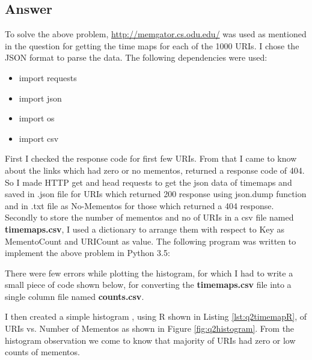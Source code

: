 \documentclass[letterpaper,11pt]{article}
\begin{document}
\subsection*{Answer}
To solve the above problem,  \url{http://memgator.cs.odu.edu/} was used as mentioned in the question for getting the time maps for each of the 1000 URIs. I chose the JSON format to parse the data. The following dependencies were used:
\begin{itemize}
  \item import requests
  \item import json
  \item import os
  \item import csv
  
\end{itemize}  
First I checked the response code for first few URIs. From that I came to know about the links which had zero or no mementos, returned a response code of 404. So I made HTTP get and head requests to get the json data of timemaps and saved in .json file for URIs which returned 200 response using json.dump \cite{jsonref} function and in .txt file as No-Mementos for those which returned a 404 response.
Secondly to store the number of mementos and no of URIs in a csv file \cite{csvref} named \textbf{timemaps.csv}, I used a dictionary to arrange them with respect to Key as MementoCount and URICount as value.
The following program was written to implement the above problem in Python 3.5:

There were few errors while plotting the histogram, for which I had to write a small piece of code shown below, for converting the \textbf{timemaps.csv} file into a single column file named \textbf{counts.csv}.

I then created a simple histogram , using R \cite{histref}  shown in Listing \ref{lst:q2timemapR}, of URIs vs. Number of Mementos as shown in Figure \ref{fig:q2histogram}. From the histogram observation we come to know that majority of URIs had zero or low counts of mementos.
\end{document}
